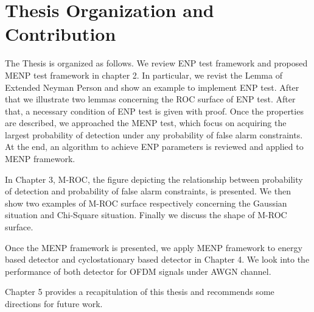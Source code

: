 \section{Thesis Organization and Contribution}
The Thesis is organized as follows. We review ENP test framework and proposed MENP test framework in chapter 2. In particular, we revist the Lemma of Extended Neyman Person and show an example to implement ENP test. After that we illustrate two lemmas concerning the ROC surface of ENP test. After that, a necessary condition of ENP test is given with proof. Once the properties are described, we approached the MENP test, which focus on acquiring the largest probability of detection under any probability of false alarm constraints. At the end, an algorithm to achieve ENP parameters is reviewed and applied to MENP framework.

In Chapter 3, M-ROC, the figure depicting the relationship between probability of detection and probability of false alarm constraints, is presented.  We then show two examples of M-ROC surface respectively concerning the Gaussian situation and Chi-Square situation. Finally we discuss the shape of M-ROC surface.

Once the MENP framework is presented, we apply MENP framework to energy based detector and cyclostationary based detector in Chapter 4. We look into the performance of both detector for OFDM signals under AWGN channel. 

Chapter 5 provides a recapitulation of this thesis and recommends some directions for future work.  
